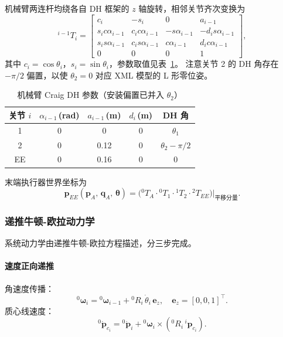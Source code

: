机械臂两连杆均绕各自 DH 框架的 $z$ 轴旋转，相邻关节齐次变换为
\begin{equation}
    {}^{i-1}T_i =
    \begin{bmatrix}
        c_i          & -s_i         &  0         & a_{i-1}       \\
        s_i c\alpha_{i-1} & c_i c\alpha_{i-1} & -s\alpha_{i-1} & -d_i s\alpha_{i-1} \\
        s_i s\alpha_{i-1} & c_i s\alpha_{i-1} &  c\alpha_{i-1} &  d_i c\alpha_{i-1} \\
        0            &  0           &  0         & 1
    \end{bmatrix},
\end{equation}
其中 $c_i = \cos\theta_i$，$s_i = \sin\theta_i$，参数取值见表~\ref{tab:dh}。
注意关节 2 的 DH 角存在 $-\pi/2$ 偏置，以使 $\theta_2=0$ 对应 XML 模型的 L 形零位姿。

\begin{table}[h]
\centering
\caption{机械臂 Craig DH 参数（安装偏置已并入 $\theta_2$）}
\label{tab:dh}
\begin{tabular}{ccccc}
\hline
关节 $i$ & $\alpha_{i-1}$\,(rad) & $a_{i-1}$\,(m) & $d_i$\,(m) & DH 角 \\
\hline
1  & 0 & 0    & 0 & $\theta_1$ \\
2  & 0 & 0.12 & 0 & $\theta_2 - \pi/2$ \\
EE & 0 & 0.16 & 0 & 0 \\
\hline
\end{tabular}
\end{table}

末端执行器世界坐标为
\begin{equation}
    \mathbf{p}_{EE}(\mathbf{p}_A,\,\mathbf{q}_A,\,\boldsymbol{\theta})
    = \bigl({}^{0}T_A \cdot {}^{0}T_1 \cdot {}^{1}T_2 \cdot {}^{2}T_{EE}
      \bigr)\big|_{\text{平移分量}}.
    \label{eq:ee_pos}
\end{equation}

\subsubsection{递推牛顿-欧拉动力学}

系统动力学由递推牛顿-欧拉方程描述，分三步完成。

\paragraph{速度正向递推}

角速度传播：
\begin{equation}
    {}^{0}\boldsymbol{\omega}_i = {}^{0}\boldsymbol{\omega}_{i-1}
    + {}^{0}R_i\,\dot{\theta}_i\,\mathbf{e}_z,
    \quad \mathbf{e}_z = [0,0,1]^\top.
\end{equation}
质心线速度：
\begin{equation}
    {}^{0}\dot{\mathbf{p}}_{c_i} = {}^{0}\dot{\mathbf{p}}_i
    + {}^{0}\boldsymbol{\omega}_i\times({}^{0}R_i\,{}^{i}\mathbf{p}_{c_i}).
\end{equation}


